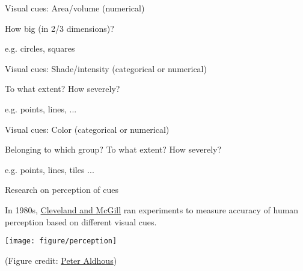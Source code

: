 \documentclass[table]{beamer}\usepackage[]{graphicx}\usepackage[]{color}
\begin{document}

\begin{frame}[fragile]{Visual cues: Area/volume (numerical)}

\begin{block}{How big (in 2/3 dimensions)?}

e.g. circles, squares

\end{block}

\vspace{15em}

\end{frame}



\begin{frame}[fragile]{Visual cues: Shade/intensity (categorical or numerical)}

\begin{block}{To what extent? How severely?}

e.g. points, lines, ...

\end{block}

\vspace{15em}

\end{frame}


\begin{frame}[fragile]{Visual cues: Color  (categorical or numerical)}

\begin{block}{Belonging to which group? To what extent? How severely?}

e.g. points, lines, tiles ...

\end{block}

\vspace{15em}

\end{frame}



\begin{frame}[fragile]{Research on perception of cues}

\begin{block}{In 1980s, \href{https://courses.ischool.berkeley.edu/i247/f05/readings/Cleveland_GraphicalPerception_Science85.pdf}{Cleveland and McGill} ran experiments to measure accuracy of human perception based on different visual cues.}

\texttt{[image: figure/perception]}

\tiny (Figure credit: \href{https://paldhous.github.io/ucb/2016/dataviz/week2.html}{Peter Aldhous})
\end{block}

\vspace{15em}

\end{frame}
\end{document}
